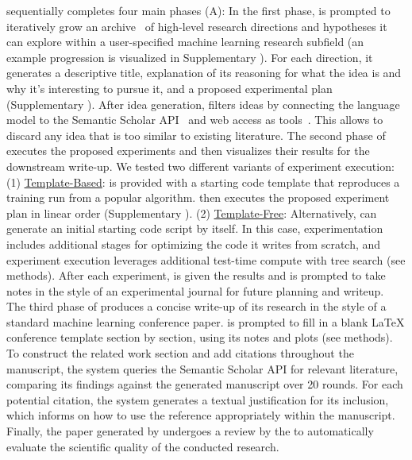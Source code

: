 \ouralgo sequentially completes four main phases (A): In the first phase, \ouralgo is prompted to iteratively grow an archive~\citep{Mouret2015IlluminatingSS} of high-level research directions and hypotheses it can explore within a user-specified machine learning research subfield (an example progression is visualized in Supplementary ).
For each direction, it generates a descriptive title, explanation of its reasoning for what the idea is and why it's interesting to pursue it, and a proposed experimental plan (Supplementary ).
After idea generation, \ouralgo filters ideas by connecting the language model to the Semantic Scholar API~\citep{fricke2018semantic} and web access as tools~\citep{schick2024toolformer}.
This allows \ouralgo to discard any idea that is too similar to existing literature.
The second phase of \ouralgo executes the proposed experiments and then visualizes their results for the downstream write-up.
We tested two different variants of experiment execution: (1) \underline{Template-Based}: \ouralgo is provided with a starting code template that reproduces a training run from a popular algorithm.
\ouralgo then executes the proposed experiment plan in linear order (Supplementary ).
(2) \underline{Template-Free}: Alternatively, \ouralgo can generate an initial starting code script by itself.
In this case, experimentation includes additional stages for optimizing the code it writes from scratch, and experiment execution leverages additional test-time compute with tree search (see methods).
After each experiment, \ouralgo is given the results and is prompted to take notes in the style of an experimental journal for future planning and writeup.
The third phase of \ouralgo produces a concise write-up of its research in the style of a standard machine learning conference paper.
\ouralgo is prompted to fill in a blank LaTeX conference template section by section, using its notes and plots (see methods).
To construct the related work section and add citations throughout the manuscript, the system queries the Semantic Scholar \citep{fricke2018semantic} API for relevant literature, comparing its findings against the generated manuscript over 20 rounds.
For each potential citation, the system generates a textual justification for its inclusion, which informs \ouralgo on how to use the reference appropriately within the manuscript.
Finally, the paper generated by \ouralgo undergoes a review by the \ourreviewer to automatically evaluate the scientific quality of the conducted research.

